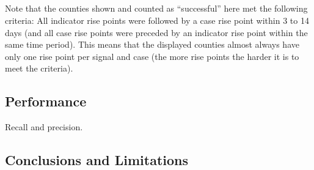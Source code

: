 \documentclass[]{article}
\begin{document}
\hypertarget{section}{%
\subsection{}\label{section}}

Note that the counties shown and counted as ``successful'' here met the
following criteria: All indicator rise points were followed by a case
rise point within 3 to 14 days (and all case rise points were preceded
by an indicator rise point within the same time period). This means that
the displayed counties almost always have only one rise point per signal
and case (the more rise points the harder it is to meet the criteria).

\hypertarget{performance}{%
\subsection{Performance}\label{performance}}

Recall and precision.

\hypertarget{conclusions-and-limitations}{%
\subsection{Conclusions and
Limitations}\label{conclusions-and-limitations}}
\end{document}
